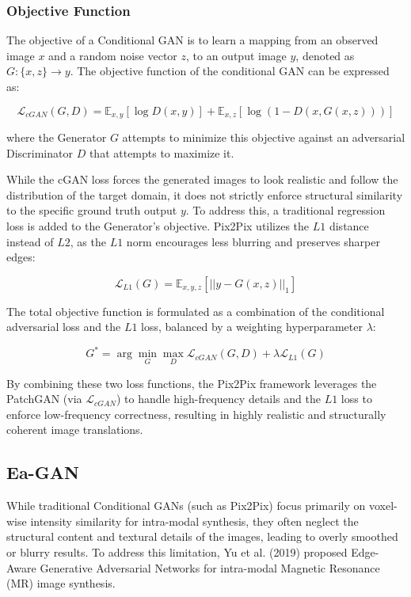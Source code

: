 \documentclass[11pt,a4paper]{article}
\begin{document}
\subsubsection{Objective Function}
The objective of a Conditional GAN is to learn a mapping from an observed image $x$ and a random noise vector $z$, to an output image $y$, denoted as $G: \{x, z\} \rightarrow y$. The objective function of the conditional GAN can be expressed as:

\begin{equation}
\mathcal{L}_{cGAN}(G, D) = \mathbb{E}_{x, y}[\log D(x, y)] + \mathbb{E}_{x, z}[\log(1 - D(x, G(x, z)))]
\end{equation}

where the Generator $G$ attempts to minimize this objective against an adversarial Discriminator $D$ that attempts to maximize it.

While the cGAN loss forces the generated images to look realistic and follow the distribution of the target domain, it does not strictly enforce structural similarity to the specific ground truth output $y$. To address this, a traditional regression loss is added to the Generator's objective. Pix2Pix utilizes the $L1$ distance instead of $L2$, as the $L1$ norm encourages less blurring and preserves sharper edges:

\begin{equation}
    \mathcal{L}_{L1}(G) = \mathbb{E}_{x, y, z}\left[||y - G(x, z)||_1\right]
\end{equation}

The total objective function is formulated as a combination of the conditional adversarial loss and the $L1$ loss, balanced by a weighting hyperparameter $\lambda$:

\begin{equation}
    G^* = \arg\min_G \max_D \mathcal{L}_{cGAN}(G, D) + \lambda \mathcal{L}_{L1}(G)
\end{equation}

By combining these two loss functions, the Pix2Pix framework leverages the PatchGAN (via $\mathcal{L}_{cGAN}$) to handle high-frequency details and the $L1$ loss to enforce low-frequency correctness, resulting in highly realistic and structurally coherent image translations.

\subsection{Ea-GAN}

While traditional Conditional GANs (such as Pix2Pix) focus primarily on voxel-wise intensity similarity for intra-modal synthesis, they often neglect the structural content and textural details of the images, leading to overly smoothed or blurry results. To address this limitation, Yu et al. (2019) \cite{yu2019} proposed Edge-Aware Generative Adversarial Networks for intra-modal Magnetic Resonance (MR) image synthesis. 
\end{document}
